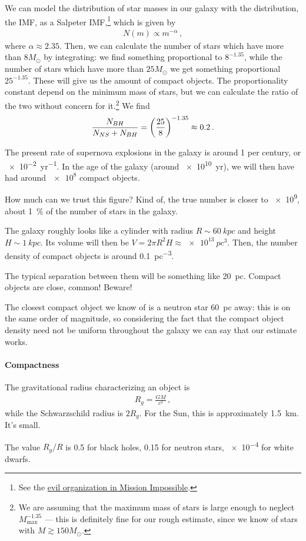 \documentclass[main.tex]{subfiles}
\begin{document}
We can model the distribution of star masses in our galaxy with the distribution, the IMF, as a Salpeter IMF,\footnote{See the \href{https://missionimpossible.fandom.com/wiki/Impossible_Mission_Force}{evil organization in Mission Impossible}.} which is given by 
%
\begin{align}
N(m) \propto m^{-\alpha }
\,,
\end{align}
%
where \(\alpha \approx \num{2.35}\). Then, we can calculate the number of stars which have more than \(8 M_{\odot}\) by integrating: we find something proportional to \(8^{-1.35}\), while the number of stars which have more than \(25 M_{\odot}\) we get something proportional \(25^{-1.35}\). These will give us the amount of compact objects.
The proportionality constant depend on the minimum mass of stars, but we can calculate the ratio of the two without concern for it.\footnote{We are assuming that the maximum mass of stars is large enough to neglect \(M _{\text{max}}^{-1.35}\) --- this is definitely fine for our rough estimate, since we know of stars with \(M \gtrsim 150 M_{\odot}\).} We find 
%
\begin{align}
\frac{N_{BH}}{N_{NS} + N_{BH}} = \qty(\frac{25}{8})^{-1.35} \approx \num{.2}
\,.
\end{align}

The present rate of supernova explosions in the galaxy is around 1 per century, or \SI{e-2}{yr^{-1}}. 
In the age of the galaxy (around \SI{e10}{yr}), we will then have had around \(\num{e8}\) compact objects. 

How much can we trust this figure? Kind of, the true number is closer to \num{e9}, about \SI{1}{\percent} of the number of stars in the galaxy.

The galaxy roughly looks like a cylinder with radius \(R \sim \SI{60}{kpc}\) and height \(H \sim \SI{1}{kpc}\).
Its volume will then be \(V = 2 \pi R^2 H \approx \SI{e13}{pc^{3}}\). Then, the number density of compact objects is around \SI{0.1}{pc^{-3}}.

The typical separation between them will be something like \SI{20}{pc}. Compact objects are close, common! Beware!

The closest compact object we know of is a neutron star \SI{60}{pc} away: this is on the same order of magnitude, so considering the fact that the compact object density need not be uniform throughout the galaxy we can say that our estimate works.

\paragraph{Compactness}
The gravitational radius characterizing an object is 
%
\begin{align}
R_g = \frac{GM}{c^2}
\,,
\end{align}
%
while the Schwarzschild radius is \(2 R_g\). For the Sun, this is approximately \SI{1.5}{km}. It's small.

The value \(R_g / R\) is \num{.5} for black holes, \num{.15} for neutron stars, \num{e-4} for white dwarfs.
\end{document}
